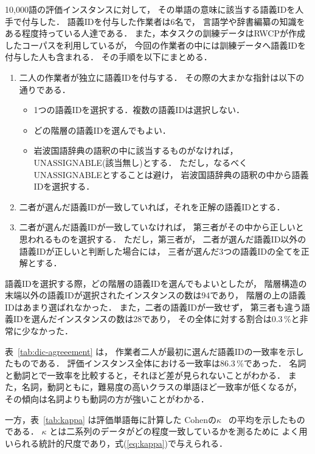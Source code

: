 10,000語の評価インスタンスに対して，
その単語の意味に該当する語義IDを人手で付与した．
語義IDを付与した作業者は6名で，
言語学や辞書編纂の知識をある程度持っている人達である．
また，本タスクの訓練データはRWCPが作成したコーパスを利用しているが，
今回の作業者の中には訓練データへ語義IDを付与した人も含まれる．
その手順を以下にまとめる．
\begin{enumerate}
\item 
  二人の作業者が独立に語義IDを付与する．
  その際の大まかな指針は以下の通りである．
  \begin{itemize}
  \item
    1つの語義IDを選択する．複数の語義IDは選択しない．
  \item 
    どの階層の語義IDを選んでもよい．
  \item 
    岩波国語辞典の語釈の中に該当するものがなければ，
    UNASSIGNABLE(該当無し)とする．
    ただし，なるべくUNASSIGNABLEとすることは避け，
    岩波国語辞典の語釈の中から語義IDを選択する．
  \end{itemize}

\item 
  二者が選んだ語義IDが一致していれば，それを正解の語義IDとする．

\item 
  二者が選んだ語義IDが一致していなければ，
  第三者がその中から正しいと思われるものを選択する．
  ただし，第三者が，
  二者が選んだ語義ID以外の語義IDが正しいと判断した場合には，
  三者が選んだ3つの語義IDの全てを正解とする．
\end{enumerate}

語義IDを選択する際，どの階層の語義IDを選んでもよいとしたが，
階層構造の末端以外の語義IDが選択されたインスタンスの数は94であり，
階層の上の語義IDはあまり選ばれなかった．
また，二者の語義IDが一致せず，
第三者も違う語義IDを選んだインスタンスの数は28であり，
その全体に対する割合は0.3\,\%と非常に少なかった．

表~\ref{tab:dic-agreeement} は，
作業者二人が最初に選んだ語義IDの一致率を示したものである．
評価インスタンス全体における一致率は86.3\,\%であった．
名詞と動詞とで一致率を比較すると，それほど差が見られないことがわかる．
また，名詞，動詞ともに，難易度の高いクラスの単語ほど一致率が低くなるが，
その傾向は名詞よりも動詞の方が強いことがわかる．

一方，表~\ref{tab:kappa} は評価単語毎に計算した
Cohenの$\kappa$~\cite{bakeman:97:a} の平均を示したものである．
$\kappa$ とは二系列のデータがどの程度一致しているかを測るために
よく用いられる統計的尺度であり，式(\ref{eq:kappa})で与えられる．



